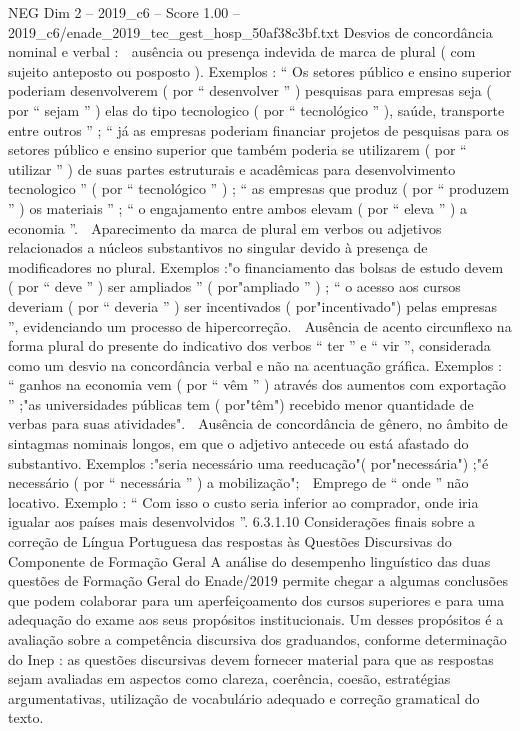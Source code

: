 \begin{textsample}{NEG Dim 2 – 2019\_c6 – Score 1.00 – 2019\_c6/enade\_2019\_tec\_gest\_hosp\_50af38c3bf.txt}
Desvios de concordância nominal e verbal :  ausência ou presença indevida de marca de plural ( com sujeito anteposto ou posposto ).
Exemplos : “ Os setores público e ensino superior poderiam desenvolverem ( por “ desenvolver ” ) pesquisas para empresas seja ( por “ sejam ” ) elas do tipo tecnologico ( por “ tecnológico ” ), saúde, transporte entre outros ” ; “ já as empresas poderiam financiar projetos de pesquisas para os setores público e ensino superior que também poderia se utilizarem ( por “ utilizar ” ) de suas partes estruturais e acadêmicas para desenvolvimento tecnologico ” ( por “ tecnológico ” ) ; “ as empresas que produz ( por “ produzem ” ) os materiais ” ; “ o engajamento entre ambos elevam ( por “ eleva ” ) a economia ”.  Aparecimento da marca de plural em verbos ou adjetivos relacionados a núcleos substantivos no singular devido à presença de modificadores no plural.
Exemplos :"o financiamento das bolsas de estudo devem ( por “ deve ” ) ser ampliados ” ( por"ampliado ” ) ; “ o acesso aos cursos deveriam ( por “ deveria ” ) ser incentivados ( por"incentivado") pelas empresas ”, evidenciando um processo de hipercorreção.  Ausência de acento circunflexo na forma plural do presente do indicativo dos verbos “ ter ” e “ vir ”, considerada como um desvio na concordância verbal e não na acentuação gráfica.
Exemplos : “ ganhos na economia vem ( por “ vêm ” ) através dos aumentos com exportação ” ;"as universidades públicas tem ( por"têm") recebido menor quantidade de verbas para suas atividades".  Ausência de concordância de gênero, no âmbito de sintagmas nominais longos, em que o adjetivo antecede ou está afastado do substantivo.
Exemplos :"seria necessário uma reeducação"( por"necessária") ;"é necessário ( por “ necessária ” ) a mobilização";  Emprego de “ onde ” não locativo.
Exemplo : “ Com isso o custo seria inferior ao comprador, onde iria igualar aos países mais desenvolvidos ”. 6.3.1.10 Considerações finais sobre a correção de Língua Portuguesa das respostas às Questões Discursivas do Componente de Formação Geral A análise do desempenho linguístico das duas questões de Formação Geral do Enade/2019 permite chegar a algumas conclusões que podem colaborar para um aperfeiçoamento dos cursos superiores e para uma adequação do exame aos seus propósitos institucionais.
Um desses propósitos é a avaliação sobre a competência discursiva dos graduandos, conforme determinação do Inep : as questões discursivas devem fornecer material para que as respostas sejam avaliadas em aspectos como clareza, coerência, coesão, estratégias argumentativas, utilização de vocabulário adequado e correção gramatical do texto.

\end{textsample}
